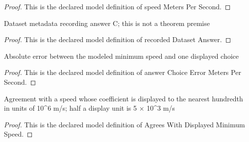 \begin{proof}
  This is the declared model definition of speed Meters Per Second.
\end{proof}
\begin{definition}
  \label{def:physics:phyx-mini-0659:phyxminiproblems-problemphyxmini0659-recordeddatasetanswer}
  Dataset metadata recording answer C; this is not a theorem premise
\end{definition}
\begin{proof}
  This is the declared model definition of recorded Dataset Answer.
\end{proof}
\begin{definition}
  \label{def:physics:phyx-mini-0659:phyxminiproblems-problemphyxmini0659-answerchoiceerrormeterspersecond}
  Absolute error between the modeled minimum speed and one displayed choice
\end{definition}
\begin{proof}
  This is the declared model definition of answer Choice Error Meters Per Second.
\end{proof}
\begin{definition}
  \label{def:physics:phyx-mini-0659:phyxminiproblems-problemphyxmini0659-agreeswithdisplayedminimumspeed}
  Agreement with a speed whose coefficient is displayed to the nearest hundredth in units of 10\textasciicircum{}6 m/s; half a display unit is 5 × 10\textasciicircum{}3 m/s
\end{definition}
\begin{proof}
  This is the declared model definition of Agrees With Displayed Minimum Speed.
\end{proof}
